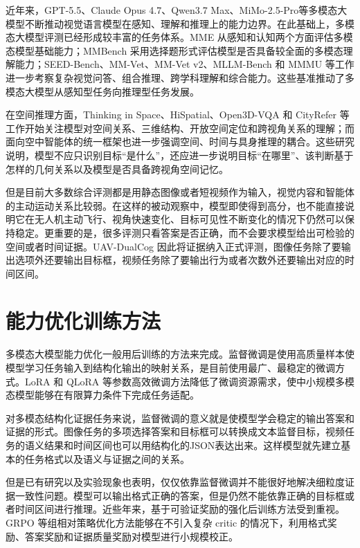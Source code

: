 近年来，GPT-5.5、Claude Opus 4.7、Qwen3.7 Max、MiMo-2.5-Pro等多模态大模型不断推动视觉语言模型在感知、理解和推理上的能力边界\cite{hurst2024gpt4o,wang2024qwen2vl,wang2025internvl3_5}。在此基础上，多模态大模型评测已经形成较丰富的任务体系。MME 从感知和认知两个方面评估多模态模型基础能力\cite{fu2023mme}；MMBench 采用选择题形式评估模型是否具备较全面的多模态理解能力\cite{liu2024mmbench}；SEED-Bench、MM-Vet、MM-Vet v2、MLLM-Bench 和 MMMU 等工作进一步考察复杂视觉问答、组合推理、跨学科理解和综合能力\cite{li2024seed,yu2023mmvet,yu2024mmvet2,ge2025mllm,yue2024mmmu}。这些基准推动了多模态大模型从感知型任务向推理型任务发展。

在空间推理方面，Thinking in Space、HiSpatial、Open3D-VQA 和 CityRefer 等工作开始关注模型对空间关系、三维结构、开放空间定位和跨视角关系的理解\cite{yang2025thinking,liang2026hispatial,zhang2025open3d,miyanishi2023cityrefer}；而面向空中智能体的统一框架也进一步强调空间、时间与具身推理的耦合\cite{xu2025aerial,yang2026vision}。这些研究说明，模型不应只识别目标“是什么”，还应进一步说明目标“在哪里”、该判断基于怎样的几何关系以及模型是否具备跨视角空间记忆。

但是目前大多数综合评测都是用静态图像或者短视频作为输入，视觉内容和智能体的主动运动关系比较弱。在这样的被动观察中，模型即使得到高分，也不能直接说明它在无人机主动飞行、视角快速变化、目标可见性不断变化的情况下仍然可以保持稳定。更重要的是，很多评测只看答案是否正确，而不会要求模型给出可检验的空间或者时间证据。UAV-DualCog 因此将证据纳入正式评测，图像任务除了要输出选项外还要输出目标框，视频任务除了要输出行为或者次数外还要输出对应的时间区间。

\section{能力优化训练方法}

多模态大模型能力优化一般用后训练的方法来完成。监督微调是使用高质量样本使模型学习任务输入到结构化输出的映射关系，是目前使用最广、最稳定的微调方式。LoRA 和 QLoRA 等参数高效微调方法降低了微调资源需求，使中小规模多模态模型能够在有限算力条件下完成任务适配\cite{hu2021lora,dettmers2023qlora,han2024peft}。

对多模态结构化证据任务来说，监督微调的意义就是使模型学会稳定的输出答案和证据的形式。图像任务的多项选择答案和目标框可以转换成文本监督目标，视频任务的语义结果和时间区间也可以用结构化的JSON表达出来。这样模型就先建立基本的任务格式以及语义与证据之间的关系。

但是已有研究以及实验现象也表明，仅仅依靠监督微调并不能很好地解决细粒度证据一致性问题。模型可以输出格式正确的答案，但是仍然不能依靠正确的目标框或者时间区间进行推理。近些年来，基于可验证奖励的强化后训练方法受到重视。GRPO 等组相对策略优化方法能够在不引入复杂 critic 的情况下，利用格式奖励、答案奖励和证据质量奖励对模型进行小规模校正\cite{shao2024deepseekmath,wen2025verifiable}。

